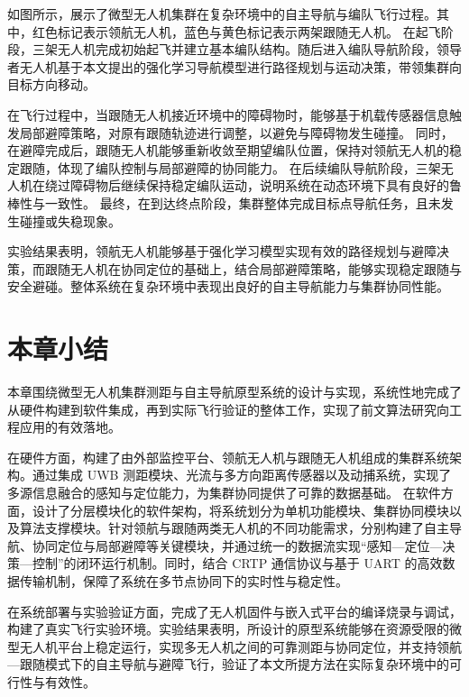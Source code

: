 如图所示，展示了微型无人机集群在复杂环境中的自主导航与编队飞行过程。其中，红色标记表示领航无人机，蓝色与黄色标记表示两架跟随无人机。
在起飞阶段，三架无人机完成初始起飞并建立基本编队结构。随后进入编队导航阶段，领导者无人机基于本文提出的强化学习导航模型进行路径规划与运动决策，带领集群向目标方向移动。

在飞行过程中，当跟随无人机接近环境中的障碍物时，能够基于机载传感器信息触发局部避障策略，对原有跟随轨迹进行调整，以避免与障碍物发生碰撞。
同时，在避障完成后，跟随无人机能够重新收敛至期望编队位置，保持对领航无人机的稳定跟随，体现了编队控制与局部避障的协同能力。
在后续编队导航阶段，三架无人机在绕过障碍物后继续保持稳定编队运动，说明系统在动态环境下具有良好的鲁棒性与一致性。
最终，在到达终点阶段，集群整体完成目标点导航任务，且未发生碰撞或失稳现象。

实验结果表明，领航无人机能够基于强化学习模型实现有效的路径规划与避障决策，而跟随无人机在协同定位的基础上，结合局部避障策略，能够实现稳定跟随与安全避碰。整体系统在复杂环境中表现出良好的自主导航能力与集群协同性能。
\section{本章小结} 

本章围绕微型无人机集群测距与自主导航原型系统的设计与实现，系统性地完成了从硬件构建到软件集成，再到实际飞行验证的整体工作，实现了前文算法研究向工程应用的有效落地。

在硬件方面，构建了由外部监控平台、领航无人机与跟随无人机组成的集群系统架构。通过集成 UWB 测距模块、光流与多方向距离传感器以及动捕系统，实现了多源信息融合的感知与定位能力，为集群协同提供了可靠的数据基础。
在软件方面，设计了分层模块化的软件架构，将系统划分为单机功能模块、集群协同模块以及算法支撑模块。针对领航与跟随两类无人机的不同功能需求，分别构建了自主导航、协同定位与局部避障等关键模块，并通过统一的数据流实现“感知—定位—决策—控制”的闭环运行机制。同时，结合 CRTP 通信协议与基于 UART 的高效数据传输机制，保障了系统在多节点协同下的实时性与稳定性。

在系统部署与实验验证方面，完成了无人机固件与嵌入式平台的编译烧录与调试，构建了真实飞行实验环境。实验结果表明，所设计的原型系统能够在资源受限的微型无人机平台上稳定运行，实现多无人机之间的可靠测距与协同定位，并支持领航—跟随模式下的自主导航与避障飞行，验证了本文所提方法在实际复杂环境中的可行性与有效性。


